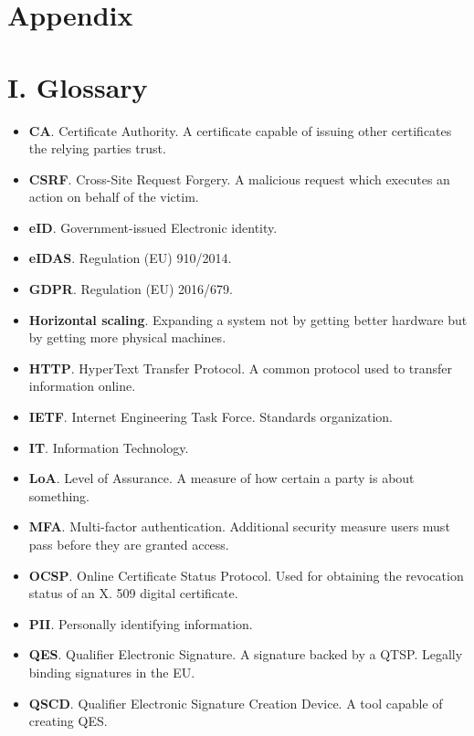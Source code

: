 \section*{Appendix}

\section*{I. Glossary}

\begin{itemize}
    \item \textbf{CA}. Certificate Authority. A certificate capable of issuing other certificates the relying parties trust.
    \item \textbf{CSRF}. Cross-Site Request Forgery. A malicious request which executes an action on behalf of the victim.
    \item \textbf{eID}. Government-issued Electronic identity.
    \item \textbf{eIDAS}. Regulation (EU) 910/2014.
    \item \textbf{GDPR}. Regulation (EU) 2016/679.
    \item \textbf{Horizontal scaling}. Expanding a system not by getting better hardware but by getting more physical machines.
    \item \textbf{HTTP}. HyperText Transfer Protocol. A common protocol used to transfer information online.
    \item \textbf{IETF}. Internet Engineering Task Force. Standards organization.
    \item \textbf{IT}. Information Technology.
    \item \textbf{LoA}. Level of Assurance. A measure of how certain a party is about something.
    \item \textbf{MFA}. Multi-factor authentication. Additional security measure users must pass before they are granted access.
    \item \textbf{OCSP}. Online Certificate Status Protocol. Used for obtaining the revocation status of an X. 509 digital certificate.
    \item \textbf{PII}. Personally identifying information.
    \item \textbf{QES}. Qualifier Electronic Signature. A signature backed by a QTSP. Legally binding signatures in the EU.
    \item \textbf{QSCD}. Qualifier Electronic Signature Creation Device. A tool capable of creating QES.

\end{itemize}
